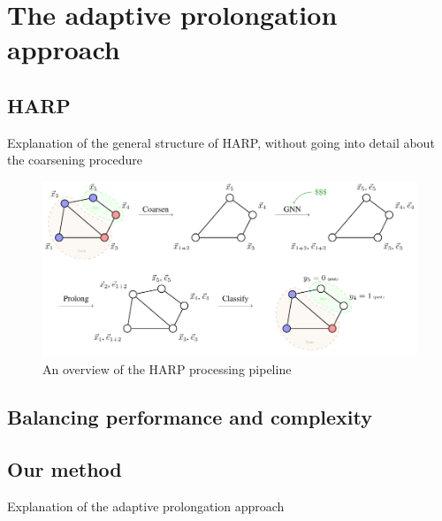 \section{The adaptive prolongation approach}
\subsection{HARP}
Explanation of the general structure of HARP, without going into detail about the coarsening procedure

\begin{figure}
  \centering
  \includegraphics[width=\linewidth]{images/harp-overview/harp-overview.pdf}
  \caption{An overview of the HARP processing pipeline}
  \label{fig:harp-overview}
\end{figure}

\subsection{Balancing performance and complexity}

\subsection{Our method}
Explanation of the adaptive prolongation approach
